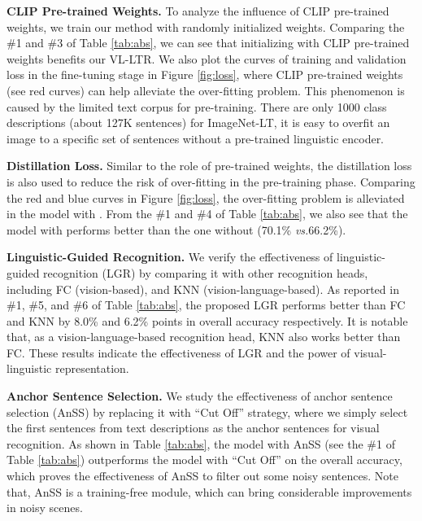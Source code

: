 \documentclass[runningheads]{llncs}
\def\vs{\emph{vs.}}
\begin{document}
\noindent\textbf{CLIP Pre-trained Weights.} To analyze the influence of CLIP pre-trained weights, we train our method with randomly initialized weights.
Comparing the \#1 and \#3 of Table \ref{tab:abs}, we can see that initializing with CLIP pre-trained weights benefits our VL-LTR.
We also plot the curves of training and validation loss in the fine-tuning stage in Figure \ref{fig:loss}, where CLIP pre-trained weights (see red curves) can help alleviate the over-fitting problem.
This phenomenon is caused by the limited text corpus for pre-training.
There are only 1000 class descriptions (about 127K sentences) for ImageNet-LT, 
it is easy to overfit an image to a specific set of sentences
without a pre-trained linguistic encoder.




\noindent\textbf{Distillation Loss.} Similar to the role of pre-trained weights, the distillation loss  is also used to reduce the risk of over-fitting in the pre-training phase.
Comparing the red and blue curves in Figure \ref{fig:loss}, the over-fitting problem is alleviated in the model with . From the \#1 and \#4 of Table \ref{tab:abs}, we also see that the model with  performs better than the one without  (70.1\% \vs 66.2\%).

\noindent\textbf{Linguistic-Guided Recognition.} We verify the effectiveness of linguistic-guided recognition (LGR) by comparing it with other recognition heads, including FC (vision-based), and KNN (vision-language-based).
As reported in \#1, \#5, and \#6 of Table \ref{tab:abs}, the proposed LGR performs better than FC and KNN by 8.0\% and 6.2\% points in overall accuracy respectively.
It is notable that, as a vision-language-based recognition head, KNN also works better than FC.
These results indicate the effectiveness of LGR and the power of visual-linguistic representation.


\noindent\textbf{Anchor Sentence Selection.} We study the effectiveness of anchor sentence selection (AnSS) by replacing it with ``Cut Off'' strategy, 
where we simply select the first  sentences from text descriptions as the anchor sentences for visual recognition.
As shown in Table \ref{tab:abs}, the model with AnSS (see the \#1 of Table \ref{tab:abs}) outperforms the model with ``Cut Off'' on the overall accuracy,
which proves the effectiveness of AnSS to filter out some noisy sentences.
Note that, AnSS is a training-free module, which can bring considerable improvements in noisy scenes.
\end{document}
